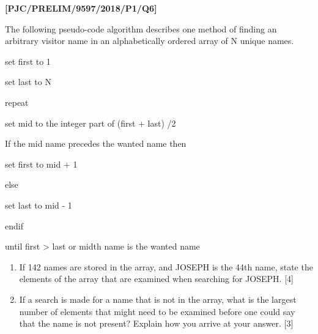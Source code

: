 \item \textbf{{[}PJC/PRELIM/9597/2018/P1/Q6{]} }

The following pseudo-code algorithm describes one method of finding
an arbitrary visitor name in an alphabetically ordered array of N
unique names. 

\noindent %
\noindent\begin{minipage}[t]{1\columnwidth}%
set first to 1 

set last to N 

repeat 

\texttt{\qquad{}}set mid to the integer part of (first + last) /2 

\texttt{\qquad{}}If the mid name precedes the wanted name then 

\texttt{\qquad{}\qquad{}}set first to mid + 1 

\texttt{\qquad{}}else 

\texttt{\qquad{}\qquad{}}set last to mid - 1

\texttt{\qquad{}}endif 

until first > last or midth name is the wanted name%
\end{minipage}
\begin{enumerate}
\item If 142 names are stored in the array, and JOSEPH is the 44th name,
state the elements of the array that are examined when searching for
JOSEPH. \hfill{}{[}4{]}
\item If a search is made for a name that is not in the array, what is the
largest number of elements that might need to be examined before one
could say that the name is not present? Explain how you arrive at
your answer. \hfill{}{[}3{]}
\end{enumerate}